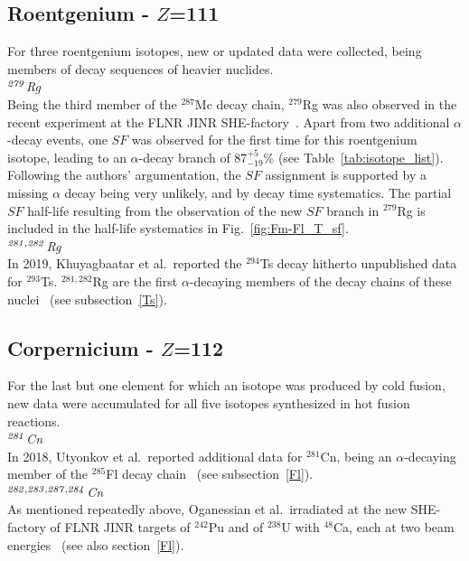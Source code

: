 \subsection{Roentgenium - $Z$=111}\label{Rg}
For three roentgenium isotopes, new or updated data were collected, being members of decay sequences of heavier nuclides.\\


{\it $^{\it279}$Rg}\\
Being the third member of the $^{287}$Mc decay chain, $^{279}$Rg was also observed in the recent experiment at the FLNR JINR SHE-factory~\cite{Oganessian2022d}. 
Apart from two additional $\alpha$-decay events, one $SF$ was observed for the first time for this roentgenium isotope, leading to an $\alpha$-decay branch of 87$^{+5}_{-19}$\% (see Table~\ref{tab:isotope_list}).
Following the authors' argumentation, the $SF$ assignment is supported by a missing $\alpha$ decay being very unlikely, and by decay time systematics.
The partial $SF$ half-life resulting from the observation of the new $SF$ branch in $^{279}$Rg is included in the half-life systematics in Fig.~\ref{fig:Fm-Fl_T_sf}.\\

{\it $^{\it281,282}$Rg}\\
In 2019, Khuyagbaatar et al.~reported the $^{294}$Ts decay hitherto unpublished data for $^{293}$Ts. $^{281,282}$Rg are the first $\alpha$-decaying members of the decay chains of these nuclei~\cite{Khuyagbaatar2019} (see subsection~\ref{Ts}).

\subsection{Corpernicium - $Z$=112}\label{Cn}
For the last but one element for which an isotope was produced by cold fusion, new data were accumulated for all five isotopes synthesized in hot fusion reactions.\\  

{\it $^{\it281}$Cn}\\
In 2018, Utyonkov et al.~reported additional data for $^{281}$Cn, being an $\alpha$-decaying member of the $^{285}$Fl decay chain~\cite{Utyonkov2018} (see subsection~\ref{Fl}).\\

{\it $^{\it282,283,287,284}$Cn}\\
As mentioned repeatedly above, Oganessian et al.~irradiated at the new SHE-factory of FLNR JINR targets of $^{242}$Pu and of $^{238}$U with $^{48}$Ca, each at two beam energies~\cite{Oganessian2022b} (see also section~\ref{Fl}).

